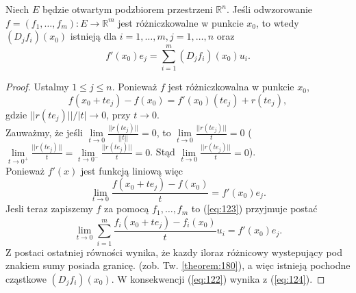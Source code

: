 \documentclass[leqno]{article}
\begin{document}
\begin{justify}
\begin{theorem}
{
    Niech $E$ będzie otwartym podzbiorem przestrzeni $\mathbb{R}^n$. Jeśli odwzorowanie $f = (f_1, \ldots, f_m) : E \to \mathbb{R}^m$ jest
    różniczkowalne w punkcie $x_0$, to wtedy $(D_j f_i)(x_0)$ istnieją dla $i = 1, \ldots, m, j = 1, \ldots, n$ oraz 
    \begin{equation}\label{eq:122}
        f'(x_0)e_j = \sum_{i=1}^{m}(D_j f_i)(x_0)u_i.
    \end{equation}
}
\end{theorem}

\begin{proof}
    Ustalmy $1 \leqslant j \leqslant n$. Ponieważ $f$ jest różniczkowalna w punkcie $x_0$,
    \[
        f(x_0 + te_j) - f(x_0) = f'(x_0)(te_j) + r(te_j),
    \]
    gdzie $||r(te_j)|| / |t| \to 0$, przy $t \to 0$. \\
    Zauważmy, że jeśli $\lim\limits_{t \to 0}\frac{||r(te_j)||}{||t||} = 0$, to $\lim\limits_{t \to 0}\frac{||r(te_j)||}{t} = 0$
    ($\lim\limits_{t \to 0^+}\frac{||r(te_j)||}{t} = \lim\limits_{t \to 0^-}\frac{||r(te_j)||}{t} = 0$. Stąd $\lim\limits_{t \to 0}\frac{||r(te_j)||}{t} = 0$). \\
    Ponieważ $f'(x)$ jest funkcją liniową więc 
    \begin{equation}\label{eq:123}
        \lim\limits_{t \to 0}\frac{f(x_0 + t e_j) - f(x_0)}{t} = f'(x_0) e_j.
    \end{equation}
    Jesli teraz zapiszemy $f$ za pomocą $f_1, \ldots, f_m$ to (\ref{eq:123}) przyjmuje postać
    \begin{equation}\label{eq:124}
        \lim\limits_{t \to 0}\sum_{i=1}^{m}\frac{f_i(x_0 + te_j) - f_i(x_0)}{t}u_i = f'(x_0)e_j.
    \end{equation}
    Z postaci ostatniej równości wynika, że kazdy iloraz różnicowy wystepujący pod znakiem sumy posiada granicę. (zob. Tw. \ref{theorem:180}), a więc 
    istnieją pochodne cząstkowe $(D_j f_i)(x_0)$. W konsekwencji (\ref{eq:122}) wynika z (\ref{eq:124}).
\end{proof}


\end{justify}
\end{document}
